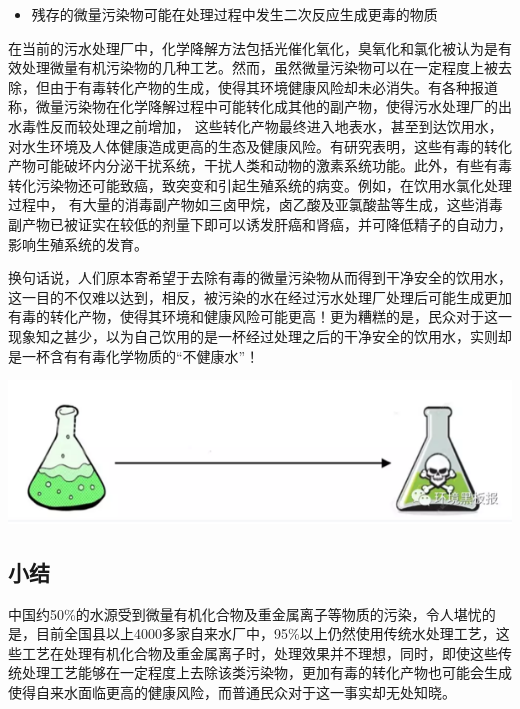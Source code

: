 \documentclass[]{book}
\providecommand{\tightlist}{%
  \setlength{\itemsep}{0pt}\setlength{\parskip}{0pt}}
\begin{document}
\begin{itemize}
\tightlist
\item
  残存的微量污染物可能在处理过程中发生二次反应生成更毒的物质
\end{itemize}

在当前的污水处理厂中，化学降解方法包括光催化氧化，臭氧化和氯化被认为是有效处理微量有机污染物的几种工艺。然而，虽然微量污染物可以在一定程度上被去除，但由于有毒转化产物的生成，使得其环境健康风险却未必消失。有各种报道称，微量污染物在化学降解过程中可能转化成其他的副产物，使得污水处理厂的出水毒性反而较处理之前增加， 这些转化产物最终进入地表水，甚至到达饮用水，对水生环境及人体健康造成更高的生态及健康风险。有研究表明，这些有毒的转化产物可能破坏内分泌干扰系统，干扰人类和动物的激素系统功能。此外，有些有毒转化污染物还可能致癌，致突变和引起生殖系统的病变。例如，在饮用水氯化处理过程中， 有大量的消毒副产物如三卤甲烷，卤乙酸及亚氯酸盐等生成，这些消毒副产物已被证实在较低的剂量下即可以诱发肝癌和肾癌，并可降低精子的自动力，影响生殖系统的发育。

换句话说，人们原本寄希望于去除有毒的微量污染物从而得到干净安全的饮用水，这一目的不仅难以达到，相反，被污染的水在经过污水处理厂处理后可能生成更加有毒的转化产物，使得其环境和健康风险可能更高！更为糟糕的是，民众对于这一现象知之甚少，以为自己饮用的是一杯经过处理之后的干净安全的饮用水，实则却是一杯含有有毒化学物质的``不健康水''！

\includegraphics[width=8.33in]{images/dushui4}

\hypertarget{ux5c0fux7ed3}{%
\subsection{小结}\label{ux5c0fux7ed3}}

中国约50\%的水源受到微量有机化合物及重金属离子等物质的污染，令人堪忧的是，目前全国县以上4000多家自来水厂中，95\%以上仍然使用传统水处理工艺，这些工艺在处理有机化合物及重金属离子时，处理效果并不理想，同时，即使这些传统处理工艺能够在一定程度上去除该类污染物，更加有毒的转化产物也可能会生成使得自来水面临更高的健康风险，而普通民众对于这一事实却无处知晓。
\end{document}
